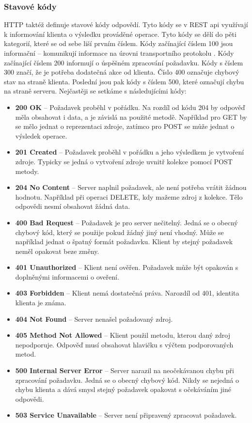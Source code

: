 \documentclass[thesis=M,czech]{FITthesis}[2019/12/23]
\begin{document}
\subsubsection*{Stavové kódy}
HTTP taktéž definuje stavové kódy odpovědí. Tyto kódy se v REST api využívají k informování klienta o výsledku prováděné operace. Tyto kódy se dělí do pěti kategorií, které se od sebe liší prvním číslem. Kódy začínající číslem 100 jsou informační -- komunikují informace na úrovni transportního protokolu \cite{http_codes}. Kódy začínající číslem 200 informují o úspěšném zpracování požadavku. Kódy s číslem 300 značí, že je potřeba dodatečná akce od klienta. Číslo 400 označuje chybový stav na straně klienta. Poslední jsou pak kódy s číslem 500, které označují chybu na straně serveru. Nejčastěji se setkáme s následujícími kódy:
\begin{itemize}
    \item \textbf{200 OK} -- Požadavek proběhl v pořádku. Na rozdíl od kódu 204 by odpověď měla obsahovat i data, a je závislá na použité metodě. Například pro GET by se mělo jednat o reprezentaci zdroje, zatímco pro POST se může jednat o výsledek operace.
    \item \textbf{201 Created} -- Požadavek proběhl v pořádku a jeho výsledkem je vytvoření zdroje. Typicky se jedná o vytvoření zdroje uvnitř kolekce pomocí POST metody.
    \item \textbf{204 No Content} -- Server naplnil požadavek, ale není potřeba vrátit žádnou hodnotu. Například při operaci DELETE, kdy mažeme zdroj z kolekce. Tělo odpovědi nesmí obsahovat žádná data.
    \item \textbf{400 Bad Request} -- Požadavek je pro server nečitelný. Jedná se o obecný chybový kód, který se použije pokud žádný jiný není vhodný. Může se například jednat o špatný formát požadavku. Klient by stejný požadavek neměl opakovat beze změny.
    \item \textbf{401 Unauthorized} -- Klient není ověřen. Požadavek může být opakován s doplněnými informacemi o oveření.
    \item \textbf{403 Forbidden} -- Klient nemá dostatečná práva. Narozdíl od 401, identita klienta je známa.
    \item \textbf{404 Not Found} -- Server nenašel požadovaný zdroj.
    \item \textbf{405 Method Not Allowed} -- Klient použil metodu, kterou daný zdroj nepodporuje. Odpověď musí obsahovat hlavičku s výčtem podporovaných metod.
    \item \textbf{500 Internal Server Error} -- Server narazil na neočekávanou chybu při zpracování požadavku. Jedná se o obecný chybový kód. Nikdy se nejedná o chybu klienta a dává smysl stejný požadavek opakovat s očekáváním jiné odpovědi.
    \item \textbf{503 Service Unavailable} -- Server není připravený zpracovat požadavek.
\end{itemize}
\end{document}
